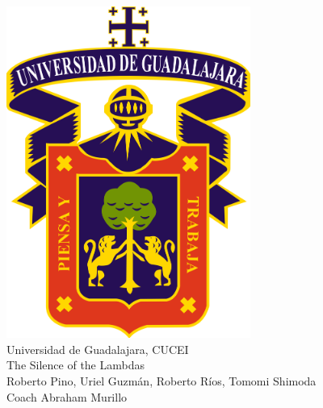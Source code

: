 \documentclass{article} %
\begin{document}
  

\pagestyle{empty}
  \begin{center}
    \strut %
    \includegraphics[width=8cm]{udg.png} \\
    {\Huge Universidad de Guadalajara, CUCEI\\}
    {\fontsize{60}{60}\selectfont The Silence of the Lambdas\\}
    \vspace{0.5cm}
    {\Large Roberto Pino, Uriel Guzmán, Roberto Ríos, Tomomi Shimoda\\}
    {\Large Coach Abraham Murillo\\}
    \vfill
    \vspace{0.5cm}
    \vspace{1cm}
  \end{center}
\clearpage
\pagestyle{fancy}
  
\end{document}
